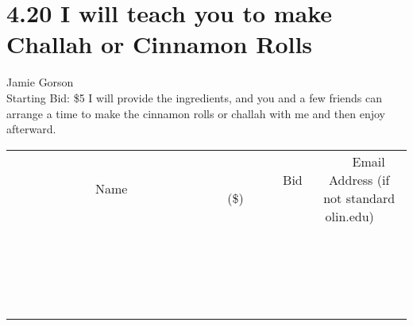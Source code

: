 \documentclass[11pt]{article}
\begin{document}
\section*{4.20 I will teach you to make Challah or Cinnamon Rolls}
Jamie Gorson
\\
Starting Bid: \$5
\newline
I will provide the ingredients, and you and a few friends can arrange a time to make the cinnamon rolls or challah with me and then enjoy afterward.
\\[3ex]
\begin{tabular}{c c c}
~~~~~~~~~~~~~Name~~~~~~~~~~~~~ & ~~~~~~~~~Bid (\$)~~~~~~~~~  & ~~~Email Address (if not standard olin.edu)~~~\\
 & & \\
\hline
 & & \\
\hline
 & & \\
\hline
 & & \\
\hline
 & & \\
\hline
 & & \\
\hline
 & & \\
\hline
 & & \\
\hline
 & & \\
\hline
 & & \\
\hline
 & & \\
\hline
 & & \\
\hline
 & & \\
\hline
 & & \\
\hline
 & & \\
\hline
 & & \\
\hline
 & & \\
\hline
 & & \\
\hline
 & & \\
\hline
\end{tabular}
\newpage
\end{document}
